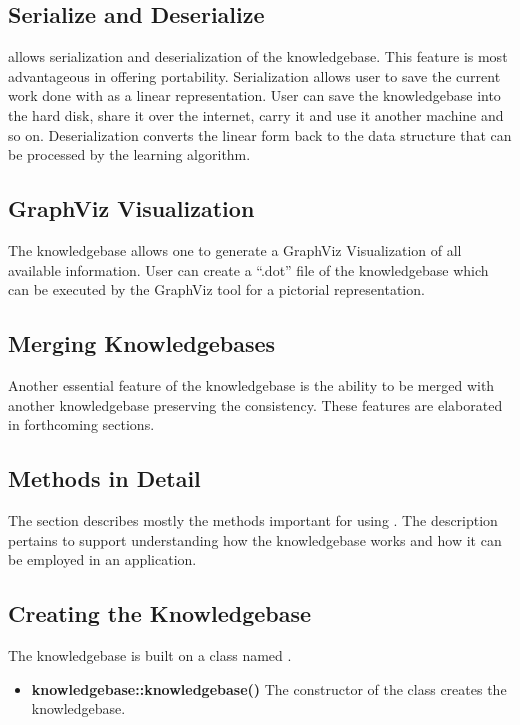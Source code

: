 \subsection*{Serialize and Deserialize} 
\libalf allows serialization and deserialization of the knowledgebase. This feature is most advantageous in offering portability. Serialization allows user to save the current work done with \libalf as a linear representation. User can save the knowledgebase into the hard disk, share it over the internet, carry it and use it another machine and so on. Deserialization converts the linear form back to the data structure that can be processed by the learning algorithm.

\subsection*{GraphViz Visualization} 
The knowledgebase allows one to generate a GraphViz Visualization of all available information. User can create a ``.dot'' file of the knowledgebase which can be executed by the GraphViz tool for a pictorial representation.

\subsection*{Merging Knowledgebases} 
Another essential feature of the knowledgebase is the ability to be merged with another knowledgebase preserving the consistency. These features are elaborated in forthcoming sections.

\subsection{Methods in Detail}
The section describes mostly the methods important for using \libalf. The description pertains to support understanding how the knowledgebase works and how it can be employed in an application. 
	
\subsection*{Creating the Knowledgebase}
The knowledgebase is built on a class named \knowledgebase. 
\begin{itemize}
 \item \textbf{knowledgebase::knowledgebase()} \vskip 1pt
	The constructor of the \knowledgebase class creates the knowledgebase.
\end{itemize}
	
